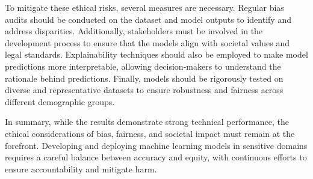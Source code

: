 	To mitigate these ethical risks, several measures are necessary. Regular bias audits should be conducted on the dataset and model outputs to identify and address disparities. Additionally, stakeholders must be involved in the development process to ensure that the models align with societal values and legal standards. Explainability techniques should also be employed to make model predictions more interpretable, allowing decision-makers to understand the rationale behind predictions. Finally, models should be rigorously tested on diverse and representative datasets to ensure robustness and fairness across different demographic groups.
	
	In summary, while the results demonstrate strong technical performance, the ethical considerations of bias, fairness, and societal impact must remain at the forefront. Developing and deploying machine learning models in sensitive domains requires a careful balance between accuracy and equity, with continuous efforts to ensure accountability and mitigate harm.
	




